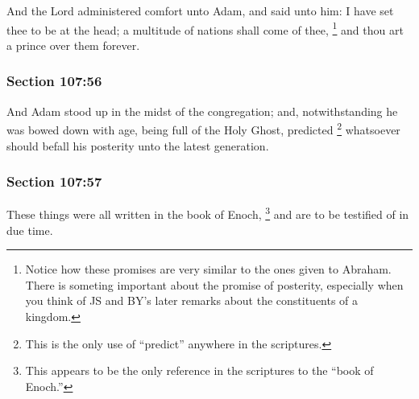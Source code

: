 		And the Lord administered comfort unto Adam, and said unto him: I have set thee to be at the head; a multitude of nations shall come of thee,%
			\footnote{%
				Notice how these promises are very similar to the ones given to Abraham. There is someting important about the promise of posterity, especially when you think of JS and BY's later remarks about the constituents of a kingdom.
				} 
		and thou art a prince over them forever.


	\subsubsection{Section 107:56} %
		\label{DC107-56}

		And Adam stood up in the midst of the congregation; and, notwithstanding he was bowed down with age, being full of the Holy Ghost, predicted%
			\footnote{%
				This is the only use of ``predict'' anywhere in the scriptures.
				}
		whatsoever should befall his posterity unto the latest generation.


	\subsubsection{Section 107:57} %
		\label{DC107-57}

		These things were all written in the book of Enoch,%
			\footnote{%
				This appears to be the only reference in the scriptures to the ``book of Enoch.''
				} 
		and are to be testified of in due time.

